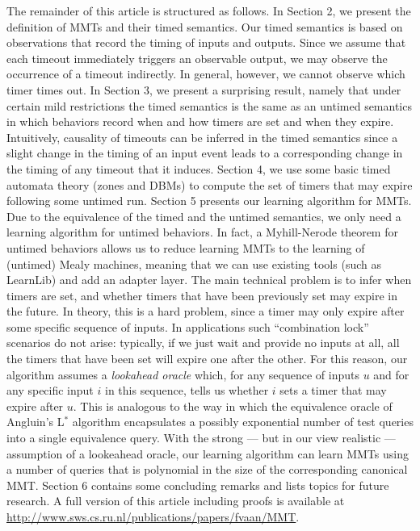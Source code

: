 The remainder of this article is structured as follows.
In Section 2, we present the definition of MMTs and their timed semantics.
Our timed semantics is based on observations that record the timing of inputs and outputs. 
Since we assume that each timeout immediately triggers an observable output, we may observe
the occurrence of a timeout indirectly. In general, however, we cannot observe which timer times out.
In Section 3, we present a surprising result, namely that under certain mild restrictions the timed semantics
is the same as an untimed semantics in which behaviors record when and how timers are set and when they expire.
Intuitively, causality of timeouts can be inferred in the timed semantics since a slight change in the timing of an input event leads to a corresponding change in the timing of any timeout that it induces.
Section 4, we use some basic timed automata theory (zones and DBMs) to compute the set of timers that may expire  following some untimed run.
Section 5 presents our learning algorithm for MMTs. 
Due to the equivalence of the timed and the untimed semantics, we only need a learning algorithm for untimed behaviors.
In fact, a Myhill-Nerode theorem for untimed behaviors allows us to reduce learning MMTs
to the learning of (untimed) Mealy machines, meaning that we can use existing tools (such as LearnLib) and add an adapter layer.
The main technical problem is to infer when timers are set, and whether timers that have been previously set may expire
in the future.
In theory, this is a hard problem, since a timer may only expire after some specific sequence of inputs.
In applications such ``combination lock'' scenarios do not arise: typically, if we just wait and provide no inputs at all,
all the timers that have been set will expire one after the other.
For this reason, our algorithm assumes a \emph{lookahead oracle} which, for any sequence of inputs $u$ and for any specific input
$i$ in this sequence, tells us whether $i$ sets a timer that may expire after $u$.
This is analogous to the way in which the equivalence oracle 
of Angluin's L$^{\ast}$ algorithm \cite{Ang87} encapsulates a possibly exponential number of test queries into
a single equivalence query.
With the strong --- but in our view realistic --- assumption of a lookeahead oracle, our learning algorithm can learn MMTs
using a number of queries that is polynomial in the size of the corresponding canonical MMT.
Section 6 contains some concluding remarks and lists topics for future research.
\iflong
%
\else
A full version of this article including proofs is available at \url{http://www.sws.cs.ru.nl/publications/papers/fvaan/MMT}.
\fi

